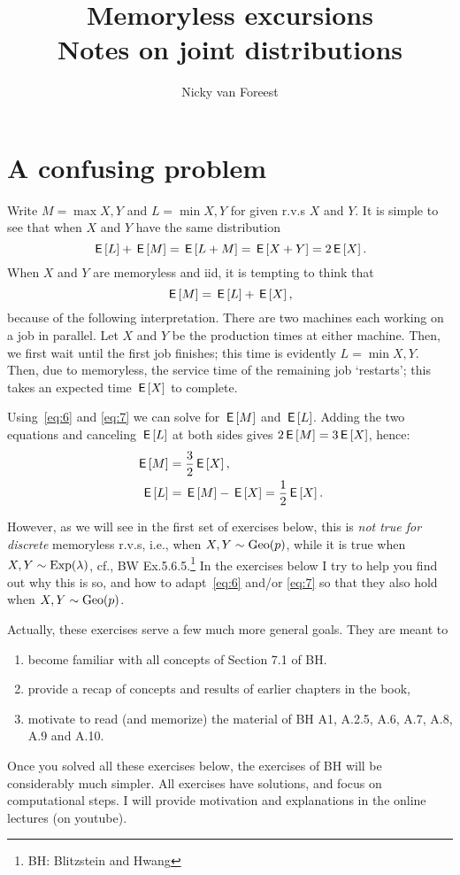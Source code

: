\documentclass[a4paper,12pt]{article}
\title{Memoryless excursions\\
Notes on joint distributions }
\author{Nicky van Foreest}
\begin{document}
\maketitle
\tableofcontents



\section{A confusing problem}
\label{sec:confusing-problem}

Write $M=\max{X,Y}$ and $L=\min{X,Y}$ for given r.v.s $X$ and $Y$.
It is simple to see that when $X$ and $Y$  have the same distribution 
\begin{equation}
  \label{eq:6}
\,\mathsf{E}\left[L\right] + \,\mathsf{E}\left[M\right] = \,\mathsf{E}\left[L+M\right]=\,\mathsf{E}\left[X+Y\right] = 2\,\mathsf{E}\left[X\right].
\end{equation}
When $X$ and $Y$ are memoryless and iid, it is  tempting to think that
\begin{equation}
  \label{eq:7}
\,\mathsf{E}\left[M\right] = \,\mathsf{E}\left[L\right]  + \,\mathsf{E}\left[X\right],
\end{equation}
because of  the following interpretation.
There are two machines each working on a job in parallel.
Let $X$ and $Y$ be the production times at either machine.
Then, we first wait until the first job finishes; this time is evidently $L=\min{X, Y}$.
Then, due to memoryless, the service time of the remaining job `restarts'; this takes an expected time $\,\mathsf{E}\left[X\right]$ to complete.

Using~\cref{eq:6} and \cref{eq:7}  we can solve for $\,\mathsf{E}\left[M\right]$ and $\,\mathsf{E}\left[L\right]$.
Adding the two equations and canceling $\,\mathsf{E}\left[L\right]$ at both sides gives $2\,\mathsf{E}\left[M\right] = 3 \,\mathsf{E}\left[X\right] $, hence:
\begin{align}
\,\mathsf{E}\left[M\right] &= \frac 3 2 \,\mathsf{E}\left[X\right],\label{eq:35}\\
\,\mathsf{E}\left[L\right] &= \,\mathsf{E}\left[M\right] - \,\mathsf{E}\left[X\right] = \frac 1 2 \,\mathsf{E}\left[X\right].\label{eq:36}
\end{align}

However, as we will see in the first set of exercises below, this is \emph{ not true for discrete} memoryless r.v.s, i.e., when $X, Y \sim \mathrm{Geo}(p)$, while it is true when $X, Y \sim \mathrm{Exp}(\lambda)$, cf., BW Ex.5.6.5.\footnote{BH: Blitzstein and Hwang}
In the exercises below I try to help you find out why this is so, and how to adapt~\cref{eq:6} and/or \cref{eq:7} so that they also hold when $X,Y\sim\mathrm{Geo}(p)$.

Actually, these exercises serve a few much more general goals. They are meant to
\begin{enumerate}
\item become familiar with all concepts of Section 7.1 of BH.
\item  provide a recap of concepts and results of  earlier chapters in the book,
\item  motivate to read (and memorize) the material of BH A1, A.2.5, A.6, A.7, A.8, A.9 and A.10.
\end{enumerate}
Once you solved all these exercises below, the exercises of BH will be considerably much simpler.
All exercises have solutions, and focus on computational steps. I will provide motivation and  explanations in the online lectures (on youtube).
\end{document}
